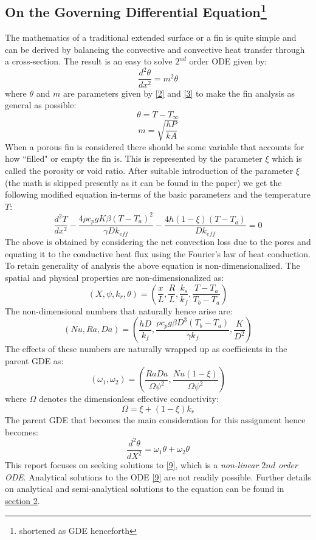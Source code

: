 \documentclass[12pt]{article}
\begin{document}
\subsection{On the Governing Differential Equation\footnote{shortened as GDE henceforth}}
The mathematics of a traditional extended surface or a fin is quite simple and can be derived by balancing the convective and convective heat transfer through a cross-section. The result is an easy to solve $2^{nd}$ order ODE given by:
\[
\frac{d^2\theta}{dx^2} = m^2 \theta \tag{1} \label{1}
\]
where $\theta$ and $m$ are parameters given by \eqref{2} and \eqref{3} to make the fin analysis as general as possible:
\[
\theta = T-T_\infty \tag{2} \label{2}
\]
\[
m = \sqrt{\frac{hP}{kA}} \tag{3} \label{3}
\]
When a porous fin is considered there should be some variable that accounts for how ``filled" or empty the fin is. This is represented by the parameter $\xi$ which is called the porosity or void ratio. After suitable introduction of the parameter $\xi$ (the math is skipped presently as it can be found in the paper) we get the following modified equation in-terms of the basic parameters and the temperature $T$: 
\[
\frac{d^2T}{dx^2} - \frac{4\rho c_p gK\beta(T-T_a)^2}{\gamma D k_{eff}} - \frac{4h(1-\xi)(T-T_a)}{Dk_{eff}} = 0 \tag{4} \label{4}
\]
The above is obtained by considering the net convection loss due to the pores and equating it to the conductive heat flux using the Fourier's law of heat conduction. To retain generality of analysis the above equation is non-dimensionalized. The spatial and physical properties are non-dimensionalized as: 
\[
(X,\psi,k_r,\theta) = \left(\frac{x}{L}, \frac{R}{L}, \frac{k_s}{k_f}, \frac{T-T_a}{T_b-T_a}\right) \tag{5} \label{5}
\]
The non-dimensional numbers that naturally hence arise are:
\[
(Nu, Ra, Da) = \left(\frac{hD}{k_f}, \frac{\rho c_p g \beta D^3 (T_b-T_a)}{\gamma k_f}, \frac{K}{D^2}\right) \tag{6} \label{6}
\]
The effects of these numbers are naturally wrapped up as coefficients in the parent GDE as:
\[
(\omega_1, \omega_2) = \left(\frac{Ra Da}{\Omega \psi^2}, \frac{Nu(1-\xi)}{\Omega \psi^2}\right) \tag{7} \label{7}
\]
where $\Omega$ denotes the dimensionless effective conductivity:
\[
\Omega = \xi + (1-\xi)k_r \tag{8} \label{8}
\]
The parent GDE that becomes the main consideration for this assignment hence becomes: 
\[
\frac{d^2\theta}{dX^2} = \omega_1 \theta + \omega_2 \theta \tag{9} \label{9}
\]
This report focuses on seeking solutions to \eqref{9}, which is a \emph{non-linear $2nd$ order ODE}. Analytical solutions to the ODE \eqref{9} are not readily possible. Further details on analytical and semi-analytical solutions to the equation can be found in \hyperref[sec:analytical]{section 2}.
\end{document}
